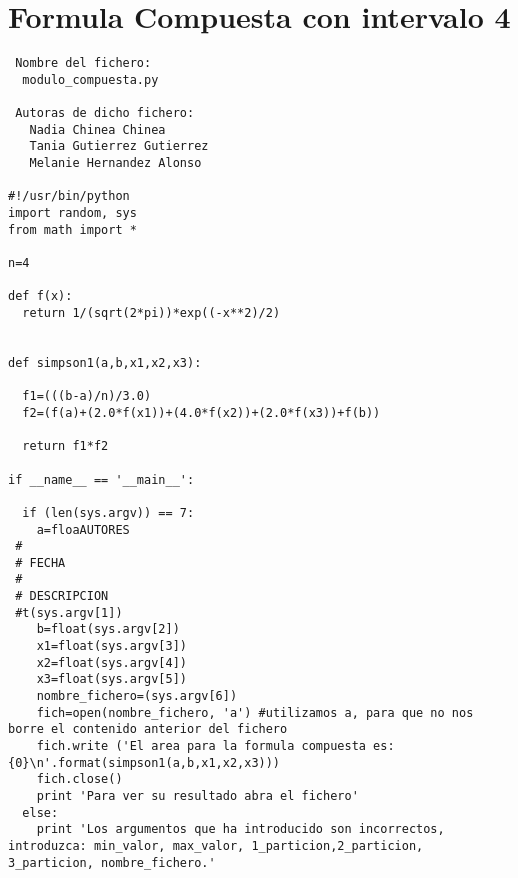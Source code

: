 \section{Formula Compuesta con intervalo 4 }
\label{sec2}
\begin{center}
\begin{footnotesize}
\begin{verbatim}
 Nombre del fichero:
  modulo_compuesta.py

 Autoras de dicho fichero:
   Nadia Chinea Chinea 
   Tania Gutierrez Gutierrez 
   Melanie Hernandez Alonso
  
#!/usr/bin/python
import random, sys
from math import *

n=4

def f(x):
  return 1/(sqrt(2*pi))*exp((-x**2)/2)
  
  
def simpson1(a,b,x1,x2,x3):
  
  f1=(((b-a)/n)/3.0)
  f2=(f(a)+(2.0*f(x1))+(4.0*f(x2))+(2.0*f(x3))+f(b))
  
  return f1*f2 
      
if __name__ == '__main__':
  
  if (len(sys.argv)) == 7:
    a=floaAUTORES
 #
 # FECHA
 #
 # DESCRIPCION
 #t(sys.argv[1])
    b=float(sys.argv[2])
    x1=float(sys.argv[3])
    x2=float(sys.argv[4])
    x3=float(sys.argv[5])
    nombre_fichero=(sys.argv[6])
    fich=open(nombre_fichero, 'a') #utilizamos a, para que no nos borre el contenido anterior del fichero
    fich.write ('El area para la formula compuesta es:{0}\n'.format(simpson1(a,b,x1,x2,x3)))
    fich.close()
    print 'Para ver su resultado abra el fichero'
  else:
    print 'Los argumentos que ha introducido son incorrectos, introduzca: min_valor, max_valor, 1_particion,2_particion, 3_particion, nombre_fichero.'
\end{verbatim}
\end{footnotesize}
\end{center}



